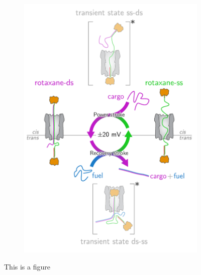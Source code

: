 \begin{figure}[ht!]
\begin{centering}
\begin{subfigure}[t]{\dimexpr.5\linewidth-1.3em\relax}
  \includegraphics[width=\linewidth,valign=t]{Figures/RotaxaneCycle.png}
  \end{subfigure}
  \caption{This is a figure \newline \newline \newline \newline \newline}
  \label{fig:test}
  \end{centering}
\end{figure}

\newpage


